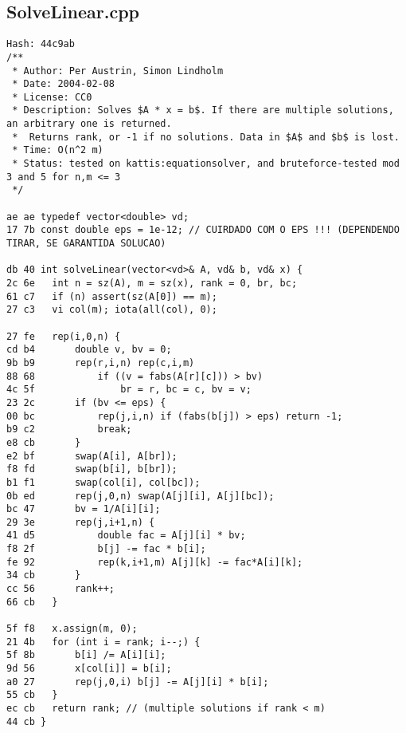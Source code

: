 \documentclass[11pt, a4paper, twoside]{article}
\begin{document}
\subsection{SolveLinear.cpp}
\begin{lstlisting}
Hash: 44c9ab
/**
 * Author: Per Austrin, Simon Lindholm
 * Date: 2004-02-08
 * License: CC0
 * Description: Solves $A * x = b$. If there are multiple solutions, an arbitrary one is returned.
 *  Returns rank, or -1 if no solutions. Data in $A$ and $b$ is lost.
 * Time: O(n^2 m)
 * Status: tested on kattis:equationsolver, and bruteforce-tested mod 3 and 5 for n,m <= 3
 */

ae ae typedef vector<double> vd;
17 7b const double eps = 1e-12; // CUIRDADO COM O EPS !!! (DEPENDENDO TIRAR, SE GARANTIDA SOLUCAO)

db 40 int solveLinear(vector<vd>& A, vd& b, vd& x) {
2c 6e 	int n = sz(A), m = sz(x), rank = 0, br, bc;
61 c7 	if (n) assert(sz(A[0]) == m);
27 c3 	vi col(m); iota(all(col), 0);
      
27 fe 	rep(i,0,n) {
cd b4 		double v, bv = 0;
9b b9 		rep(r,i,n) rep(c,i,m)
88 68 			if ((v = fabs(A[r][c])) > bv)
4c 5f 				br = r, bc = c, bv = v;
23 2c 		if (bv <= eps) {
00 bc 			rep(j,i,n) if (fabs(b[j]) > eps) return -1;
b9 c2 			break;
e8 cb 		}
e2 bf 		swap(A[i], A[br]);
f8 fd 		swap(b[i], b[br]);
b1 f1 		swap(col[i], col[bc]);
0b ed 		rep(j,0,n) swap(A[j][i], A[j][bc]);
bc 47 		bv = 1/A[i][i];
29 3e 		rep(j,i+1,n) {
41 d5 			double fac = A[j][i] * bv;
f8 2f 			b[j] -= fac * b[i];
fe 92 			rep(k,i+1,m) A[j][k] -= fac*A[i][k];
34 cb 		}
cc 56 		rank++;
66 cb 	}
      
5f f8 	x.assign(m, 0);
21 4b 	for (int i = rank; i--;) {
5f 8b 		b[i] /= A[i][i];
9d 56 		x[col[i]] = b[i];
a0 27 		rep(j,0,i) b[j] -= A[j][i] * b[i];
55 cb 	}
ec cb 	return rank; // (multiple solutions if rank < m)
44 cb }
\end{lstlisting}
\end{document}
